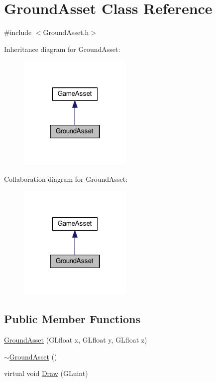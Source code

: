 \hypertarget{classGroundAsset}{}\section{Ground\+Asset Class Reference}
\label{classGroundAsset}


{\ttfamily \#include $<$Ground\+Asset.\+h$>$}



Inheritance diagram for Ground\+Asset\+:\nopagebreak
\begin{figure}[H]
\begin{center}
\leavevmode
\includegraphics[width=154pt]{classGroundAsset__inherit__graph}
\end{center}
\end{figure}


Collaboration diagram for Ground\+Asset\+:\nopagebreak
\begin{figure}[H]
\begin{center}
\leavevmode
\includegraphics[width=154pt]{classGroundAsset__coll__graph}
\end{center}
\end{figure}
\subsection*{Public Member Functions}
\begin{DoxyCompactItemize}
\item 
\hyperlink{classGroundAsset_a4b927d07732cb30f8d5b35047bc2de22}{Ground\+Asset} (G\+Lfloat x, G\+Lfloat y, G\+Lfloat z)
\item 
\hyperlink{classGroundAsset_a8f607f3cabded6280c5a5eb2cbfa8c79}{$\sim$\+Ground\+Asset} ()
\item 
virtual void \hyperlink{classGroundAsset_a440f983638c7a7ccb6a39718444dfe95}{Draw} (G\+Luint)
\end{DoxyCompactItemize}
